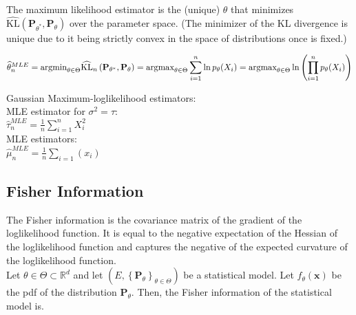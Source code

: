 The maximum likelihood estimator is the (unique) $\theta$ that minimizes $\widehat{\text {KL}}\left(\mathbf{P}_{\theta ^*}, \mathbf{P}_{\theta }\right)$ over the parameter space. (The minimizer of the KL divergence is unique due to it being strictly convex in the space of distributions once  is fixed.)

$\widehat{\theta }_ n^{MLE} =\\ \displaystyle \text {argmin}_{\theta \in \Theta }\widehat{\text {KL}}_ n\left(\mathbf{P}_{\theta ^*}, \mathbf{P}_{\theta }\right) =\\ \displaystyle \text {argmax}_{\theta \in \Theta } \sum _{i=1}^{n} \ln p_{\theta }(X_ i) =\\  \displaystyle \text {argmax}_{\theta \in \Theta } \ln \left(\prod _{i=1}^{n} p_{\theta }(X_ i)\right)$

Gaussian Maximum-loglikelihood estimators:\\

 MLE estimator for $\sigma^2 = \tau$:\\  
$\hat{\tau }_ n^{MLE} = \frac{1}{n} \sum _{i = 1}^ n X_ i^2$\\

MLE estimators:\\

$\hat{\mu}_ n^{MLE}=\frac{1}{n}\sum_{i=1}(x_i)$


\subsection{Fisher Information}

The Fisher information is the covariance matrix of the gradient of the loglikelihood function. It is equal to the negative expectation of the Hessian of the loglikelihood function and captures the negative of the expected curvature of the loglikelihood function.\\

Let $\theta \in \Theta \subset \mathbb {R}^ d$ and let $\left(E,\left\{ \mathbf{P}_\theta \right\} _{\theta \in \Theta }\right)$ be a statistical model. Let $f_{\theta }(\mathbf x)$ be the pdf of the distribution $\mathbf{P}_\theta$. Then, the Fisher information of the statistical model is.\\


